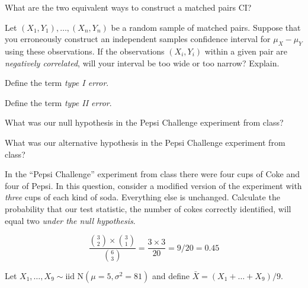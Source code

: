 \documentclass[addpoints,12pt]{exam}
\begin{document}
\begin{questions}
\question What are the two equivalent ways to construct a matched pairs CI?

\question Let $(X_1, Y_1), \dots, (X_n, Y_n)$ be a random sample of matched pairs. 
Suppose that you erroneously construct an independent samples confidence interval for $\mu_X - \mu_Y$ using these observations.
If the observations $(X_i, Y_i)$ within a given pair are \emph{negatively correlated}, will your interval be too wide or too narrow? 
Explain.


\question Define the term \emph{type I error}.

\question Define the term \emph{type II error}.

\question What was our null hypothesis in the Pepsi Challenge experiment from class?

\question What was our alternative hypothesis in the Pepsi Challenge experiment from class?

  \question In the ``Pepsi Challenge'' experiment from class there were four cups of Coke and four of Pepsi.
In this question, consider a modified version of the experiment with \emph{three} cups of each kind of soda.
Everything else is unchanged.
Calculate the probability that our test statistic, the number of cokes correctly identified, will equal two \emph{under the null hypothesis}.
\begin{solution}
  \[
    \frac{ \displaystyle {3 \choose 2} \times {3 \choose 1} }{\displaystyle{6 \choose 3}} = \frac{3 \times 3}{20} = 9/20 = 0.45
  \]
\end{solution}



\question Let $X_1, \dots, X_9 \sim \text{iid N}(\mu = 5, \sigma^2 = 81)$ and define $\bar{X} = (X_1 + \dots + X_9)/9$. 
\end{questions}
\end{document}
